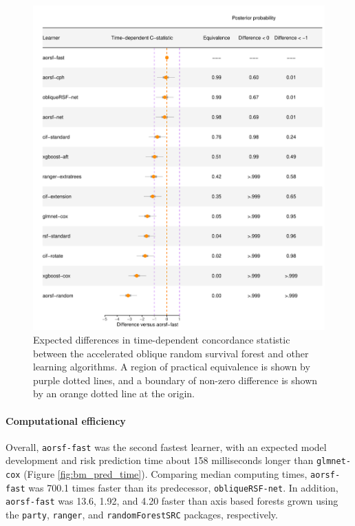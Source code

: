 \documentclass{article}\usepackage[]{graphicx}\usepackage[]{xcolor}
\makeatletter
\def\maxwidth{ %
  \ifdim\Gin@nat@width>\linewidth
    \linewidth
  \else
    \Gin@nat@width
  \fi
}
\newenvironment{knitrout}{}{} %
\makeatother
\begin{document}
\begin{knitrout}
\color{fgcolor}\begin{figure}
\includegraphics[width=\maxwidth]{figure/bm_pred_model_viz_cstat-1} \caption[Expected differences in time-dependent concordance statistic between the accelerated oblique random survival forest and other learning algorithms]{Expected differences in time-dependent concordance statistic between the accelerated oblique random survival forest and other learning algorithms. A region of practical equivalence is shown by purple dotted lines, and a boundary of non-zero difference is shown by an orange dotted line at the origin.}\label{fig:bm_pred_model_viz_cstat}
\end{figure}

\end{knitrout}




\paragraph{Computational efficiency}

Overall, \texttt{aorsf-fast} was the second fastest learner, with an expected model development and risk prediction time about 158 milliseconds longer than \texttt{glmnet-cox} (Figure \ref{fig:bm_pred_time}). Comparing median computing times, \texttt{aorsf-fast} was 700.1 times faster than its predecessor, \texttt{obliqueRSF-net}. In addition, \texttt{aorsf-fast} was 13.6, 1.92, and 4.20 faster than axis based forests grown using the \texttt{party}, \texttt{ranger}, and \texttt{randomForestSRC} packages, respectively.
\end{document}
